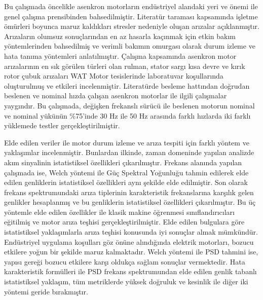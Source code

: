 Bu çalışmada öncelikle asenkron motorların endüstriyel alandaki yeri ve önemi ile genel çalışma prensibinden bahsedilmiştir. Literatür taraması kapsamında işletme ömürleri boyunca maruz kaldıkları stresler nedeniyle oluşan arızalar açıklanmıştır. Arızaların olumsuz sonuçlarından en az hasarla kaçınmak için etkin bakım yöntemlerinden bahsedilmiş ve verimli bakımın omurgası olarak durum izleme ve hata tanıma yöntemleri anlatılmıştır. Çalışma kapsamında asenkron motor arızalarının en sık görülen türleri olan rulman, stator sargı kısa devre ve kırık rotor çubuk arızaları WAT Motor tesislerinde laboratuvar koşullarında oluşturulmuş ve etkileri incelenmiştir. Literatürde besleme hattından doğrudan beslenen ve nominal hızda çalışan asenkron motorlar ile ilgili çalışmalar yaygındır. Bu çalışmada, değişken frekanslı sürücü ile beslenen motorun nominal ve nominal yükünün \%75'inde 30 Hz ile 50 Hz arasında farklı hızlarda iki farklı yüklemede testler gerçekleştirilmiştir.

Elde edilen veriler ile motor durum izleme ve arıza tespiti için farklı yöntem ve yaklaşımlar incelenmiştir. Bunlardan ilkinde, zaman domeninde yapılan analizde akım sinyalinin istatistiksel özellikleri çıkarılmıştır. Frekans alanında yapılan çalışmada ise, Welch yöntemi ile Güç Spektral Yoğunluğu tahmin edilerek elde edilen genliklerin istatistiksel özellikleri aynı şekilde elde edilmiştir. Son olarak frekans spektrumundaki arıza tiplerinin karakteristik frekanslarına karşılık gelen genlikler hesaplanmış ve bu genliklerin istatistiksel özellikleri çıkarılmıştır. Bu üç yöntemle elde edilen özellikler ile klasik makine öğrenmesi sınıflandırıcıları eğitilmiş ve motor arıza teşhisi gerçekleştirilmiştir. Elde edilen bulgulara göre istatistiksel yaklaşımlarla arıza teşhisi konusunda iyi sonuçlar almak mümkündür. Endüstriyel uygulama koşulları göz önüne alındığında elektrik motorları, bozucu etkilere yoğun bir şekilde maruz kalmaktadır. Welch yöntemi ile PSD tahmini ise, yapısı gereği bozucu etkilere karşı oldukça sağlam sonuçlar vermektedir. Hata karakteristik formülleri ile PSD frekans spektrumundan elde edilen genlik tabanlı istatistiksel yaklaşım, tüm metriklerde yüksek doğruluk ve kesinlik ile diğer iki yöntemi geride bırakmıştır.

